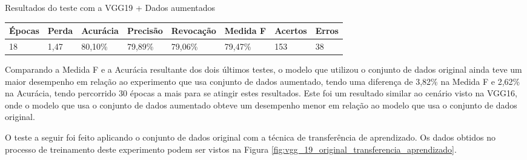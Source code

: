 \documentclass[
	12pt,				%
	oneside,			%
	a4paper,			%
	english,			%
	brazil				%
	]{abntex2ppgsi}
\begin{document}
\begin{quadro}[H]
\caption{Resultados do teste com a VGG19 + Dados aumentados}
\label{quad:resultados_teste_vgg_19_com_dados_aumentados}
\centering
\begin{tabular}{|l|l|l|l|l|l|l|l|}
\cline{1-8}
Épocas & Perda & Acurácia & Precisão & Revocação & Medida F & Acertos & Erros \\ \hline
18 & 1,47 & 80,10\% & 79,89\% & 79,06\% & 79,47\% & 153 & 38 \\
\cline{1-8}
\end{tabular}
\end{quadro}

Comparando a Medida F e a Acurácia resultante dos dois últimos testes, o modelo que utilizou o conjunto de dados original ainda teve um maior desempenho em relação ao experimento que usa conjunto de dados aumentado, tendo uma diferença de 3,82\% na Medida F e 2,62\% na Acurácia, tendo percorrido 30 épocas a mais para se atingir estes resultados. Este foi um resultado similar ao cenário visto na VGG16, onde o modelo que usa o conjunto de dados aumentado obteve um desempenho menor em relação ao modelo que usa o conjunto de dados original.

O teste a seguir foi feito aplicando o conjunto de dados original com a técnica de transferência de aprendizado. Os dados obtidos no processo de treinamento deste experimento podem ser vistos na Figura \ref{fig:vgg_19_original_transferencia_aprendizado}.
\end{document}
